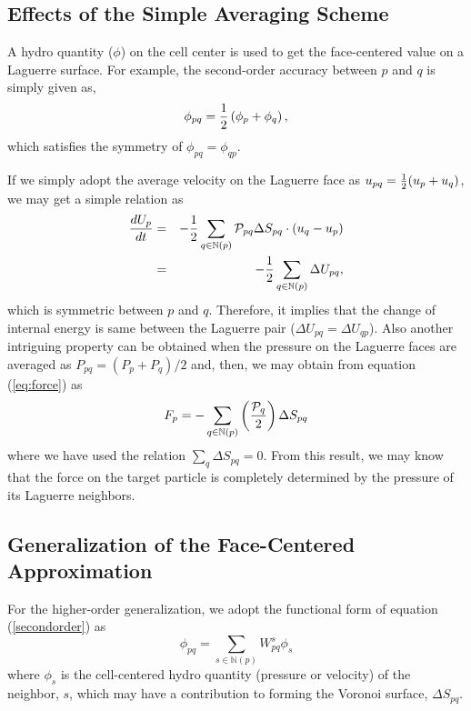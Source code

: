\documentclass[twocolumn]{aastex63}
\newcommand{\vel}{{u}}
\newcommand{\surf}[0]{S}
\newcommand{\pressure}[0]{\mathcal{P}}
\begin{document}
\subsection{Effects of the Simple Averaging Scheme}	
A hydro quantity ($\phi$) on the cell center is used to get the face-centered value on a Laguerre surface. For example, the second-order accuracy between $p$ and $q$ is simply given as,
\begin{equation} \label{secondorder}
	\phi_{pq} = {1\over2} \left( \phi_p + \phi_q\right),
\end{equation}
which  satisfies the symmetry of $\phi_{pq} = \phi_{qp}$. 
		
If we simply adopt the average velocity on the Laguerre face as $\vel_{pq} = {1\over2} (\vel_p + \vel_q)$, we may get a simple relation as
\begin{eqnarray}
	{dU_p\over dt} &=& -{1\over2}\sum_{q\in\mathbb{N}(p)} \pressure_{pq}\Delta \surf_{pq}\cdot (\vel_q - \vel_p) \\
	&=& -{1\over2}\sum_{q\in\mathbb{N}(p)} \Delta U_{pq},
\end{eqnarray}
which is symmetric between $p$ and $q$. Therefore, it implies that the change of internal energy is same between the Laguerre pair ($\Delta U_{pq} = \Delta U_{qp}$).
Also another intriguing property can be obtained when the pressure on the Laguerre faces are averaged as $P_{pq}=(P_p+P_q)/2$ and, then, we may obtain from equation (\ref{eq:force}) as
\begin{equation} \label{eq:netforce}
				F_p = - \sum_{q\in\mathbb{N}(p)}\left({\pressure_q\over2}\right) \Delta \surf_{pq}
\end{equation}
where we have used the relation $ \sum_q \Delta \surf_{pq} = 0$. From this result, we may know that the force on the target particle is completely determined by the pressure of its Laguerre neighbors.

\subsection{Generalization of the Face-Centered Approximation}
For the higher-order generalization, we adopt the functional form of equation (\ref{secondorder}) as
\begin{equation}
	\phi_{pq} = \sum_{s\in\mathbb{N}(p)}{W}_{pq}^s {\phi}_{s}
\end{equation}
where ${\phi}_{s}$ is the cell-centered hydro quantity (pressure or velocity) of the neighbor, $s$, which may have a contribution to forming the Voronoi surface, $\Delta\surf_{pq}$.
\end{document}
